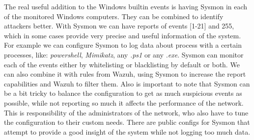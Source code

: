 \linej
The real useful addition to the Windows builtin events is having Sysmon\cite{sysmon} in each of the monitored Windows computers. They can be combined to identify attackers better\cite{detection_events}.
\linej
With Sysmon we can have reports of events [1-21] and 255, which in some cases provide very precise and useful information of the system. For example we can configure Sysmon to log data about process with a certain processes, like: \textit{powershell}, \textit{Mimikatz}, any \textit{.ps1} or any \textit{.exe}.
Sysmon can monitor each of the events either by whitelisting or blacklisting by default or both. We can also combine it with rules from Wazuh, using Sysmon to increase the report capabilities and Wazuh to filter them.
\linej
\linej
Also is important to note that Sysmon can be a bit tricky to balance the configuration to get as much suspicious events as possible, while not reporting so much it affects the performance of the network. This is responsibility of the administrators of the network, who also have to tune the configuration to their custom needs.
There are public configs for Sysmon that attempt to provide a good insight of the system while not logging too much data\cite{sysmon_config}.

